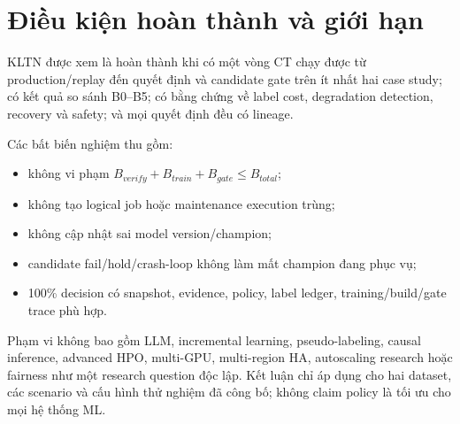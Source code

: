 \section{Điều kiện hoàn thành và giới hạn}

KLTN được xem là hoàn thành khi có một vòng CT chạy được từ production/replay đến quyết định và candidate gate trên ít nhất hai case study; có kết quả so sánh B0--B5; có bằng chứng về label cost, degradation detection, recovery và safety; và mọi quyết định đều có lineage.

Các bất biến nghiệm thu gồm:

\begin{itemize}
  \item không vi phạm \(B_{verify}+B_{train}+B_{gate}\leq B_{total}\);
  \item không tạo logical job hoặc maintenance execution trùng;
  \item không cập nhật sai model version/champion;
  \item candidate fail/hold/crash-loop không làm mất champion đang phục vụ;
  \item 100\% decision có snapshot, evidence, policy, label ledger, training/build/gate trace phù hợp.
\end{itemize}

Phạm vi không bao gồm LLM, incremental learning, pseudo-labeling, causal inference, advanced HPO, multi-GPU, multi-region HA, autoscaling research hoặc fairness như một research question độc lập. Kết luận chỉ áp dụng cho hai dataset, các scenario và cấu hình thử nghiệm đã công bố; không claim policy là tối ưu cho mọi hệ thống ML.

